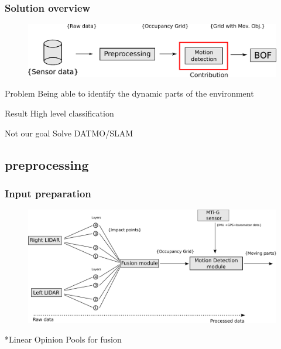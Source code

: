\documentclass{beamer}
\begin{document}
	\begin{frame}
		\frametitle{Solution overview}
		\begin{figure}[h]
			\center
			\includegraphics[scale=0.6]{img/fig:motion:overview:01}
		 \end{figure}
		\begin{block}{Problem}
			 Being able to identify the dynamic parts of the environment
		\end{block}
		 
		\begin{block}{Result}
			High level classification
		\end{block}				 

		\begin{alertblock}{Not our goal}
			Solve DATMO/SLAM
		\end{alertblock}
	\end{frame}

\subsection{preprocessing}

	\begin{frame}
		\frametitle{Input preparation}
		\begin{figure}[h]
			\center
			\includegraphics[scale=0.18]{../img/fig:motion:framework}
		\end{figure}
		
		*Linear Opinion Pools \cite{ADARVE-2012-671211} for fusion
	
	\end{frame}
\end{document}
